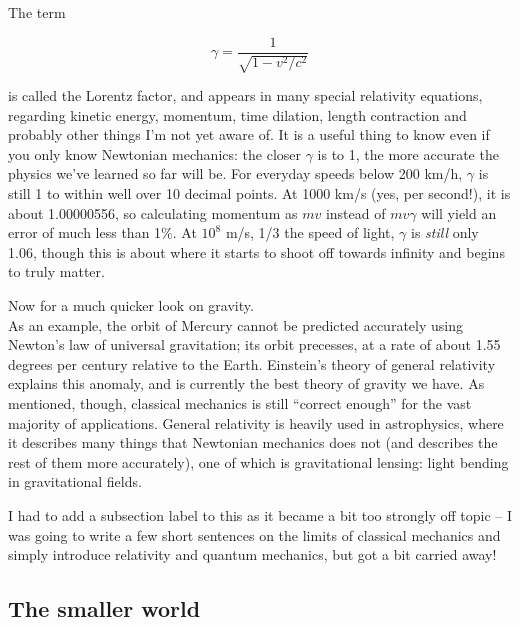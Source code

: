 The term

\begin{equation}
\gamma = \frac{1}{\sqrt{1 - v^2/c^2}}
\end{equation}

is called the Lorentz factor, and appears in many special relativity equations, regarding kinetic energy, momentum, time dilation, length contraction and probably other things I'm not yet aware of. It is a useful thing to know even if you only know Newtonian mechanics: the closer $\gamma$ is to 1, the more accurate the physics we've learned so far will be. For everyday speeds below 200 km/h, $\gamma$ is still 1 to within well over 10 decimal points. At 1000 km/s (yes, per second!), it is about 1.00000556, so calculating momentum as $m v$ instead of $m v \gamma$ will yield an error of much less than 1\%. At $10^8$ m/s, 1/3 the speed of light, $\gamma$ is \emph{still} only 1.06, though this is about where it starts to shoot off towards infinity and begins to truly matter.

Now for a much quicker look on gravity.\\
As an example, the orbit of Mercury cannot be predicted accurately using Newton's law of universal gravitation; its orbit precesses, at a rate of about 1.55 degrees per century relative to the Earth. Einstein's theory of general relativity explains this anomaly, and is currently the best theory of gravity we have. As mentioned, though, classical mechanics is still ``correct enough'' for the vast majority of applications. General relativity is heavily used in astrophysics, where it describes many things that Newtonian mechanics does not (and describes the rest of them more accurately), one of which is gravitational lensing: light bending in gravitational fields.

I had to add a subsection label to this as it became a bit too strongly off topic -- I was going to write a few short sentences on the limits of classical mechanics and simply introduce relativity and quantum mechanics, but got a bit carried away!

\subsection{The smaller world}

